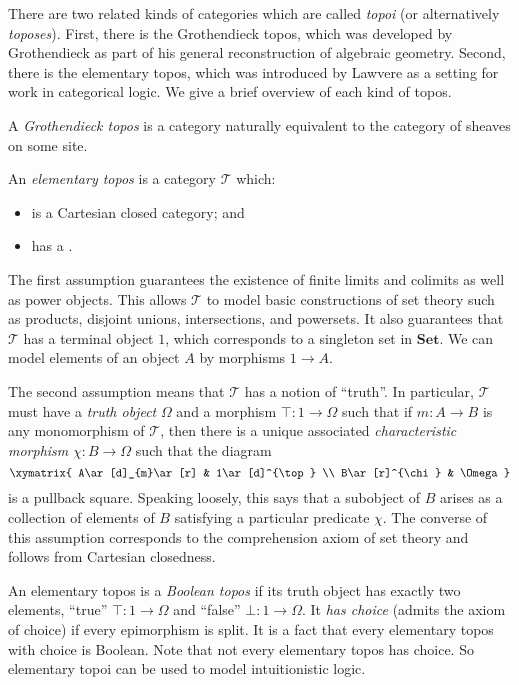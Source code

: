 \documentclass[12pt]{article}
\begin{document}

There are two related kinds of categories which are called \emph{topoi} (or alternatively \emph{toposes}).  First, there is the Grothendieck topos, which was developed by Grothendieck as part of his general reconstruction of algebraic geometry.  Second, there is the elementary topos, which was introduced by Lawvere as a setting for work in categorical logic.  We give a brief overview of each kind of topos.

A \emph{Grothendieck topos} is a category naturally equivalent to the category of sheaves on some site. %

An \emph{elementary topos} is a category $\mathcal{T}$ which:
\begin{itemize}
\item
is a Cartesian closed category; and

\item
has a .
\end{itemize}
The first assumption guarantees the existence of finite limits and colimits as well as power objects.  This allows $\mathcal{T}$ to model basic constructions of set theory such as products, disjoint unions, intersections, and powersets.  It also guarantees that $\mathcal{T}$ has a terminal object $1$, which corresponds to a singleton set in $\mathbf{Set}$.  We can model elements of an object $A$ by morphisms $1\to A$.

The second assumption means that $\mathcal{T}$ has a notion of ``truth''.  In particular, $\mathcal{T}$ must have a \emph{truth object} $\Omega$ and a morphism $\top\colon 1\to\Omega$ such that if $m\colon A\to B$ is any monomorphism of $\mathcal{T}$, then there is a unique associated \emph{characteristic morphism} $\chi\colon B\to\Omega$ such that the diagram
\[\xymatrix{
A\ar[d]_{m}\ar[r] & 1\ar[d]^{\top} \\
B\ar[r]^{\chi}    & \Omega
}\]
is a pullback square.  Speaking loosely, this says that a subobject of $B$ arises as a collection of elements of $B$ satisfying a particular predicate $\chi$.  The converse of this assumption corresponds to the comprehension axiom of set theory and follows from Cartesian closedness. 

An elementary topos is a \emph{Boolean topos} if its truth object has exactly two elements, ``true'' $\top\colon 1\to\Omega$ and ``false'' $\bot\colon 1\to\Omega$.  It \emph{has choice} (admits the axiom of choice) if every epimorphism is split.  It is a fact that every elementary topos with choice is Boolean.  Note that not every elementary topos has choice.  So elementary topoi can be used to model intuitionistic logic.
\end{document}
